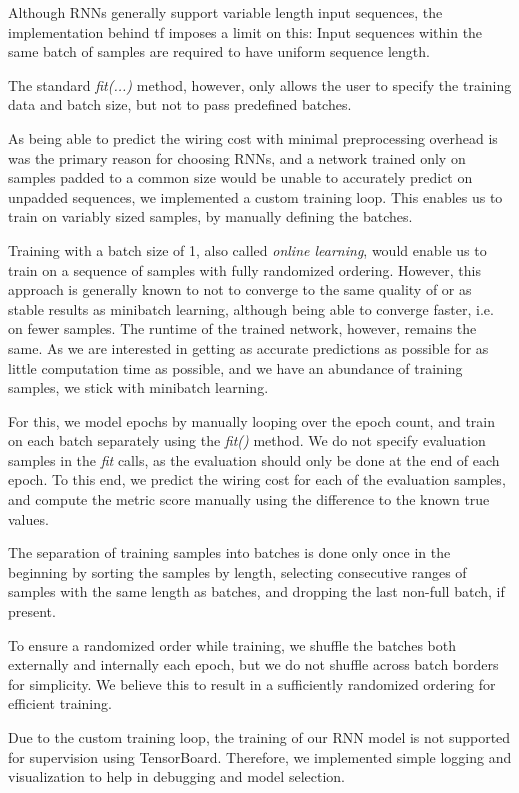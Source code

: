 Although \glspl{RNN} generally support variable length input sequences, the implementation behind \gls{tf} imposes a limit on this: Input sequences within the same batch of samples are required to have uniform sequence length.

The standard \textit{fit(...)} method, however, only allows the user to specify the training data and batch size, but not to pass predefined batches.

As being able to predict the wiring cost with minimal preprocessing overhead is was the primary reason for choosing \glspl{RNN}, and a network trained only on samples padded to a common size would be unable to accurately predict on unpadded sequences, we implemented a custom training loop. This enables us to train on variably sized samples, by manually defining the batches.

Training with a batch size of 1, also called \textit{online learning}, would enable us to train on a sequence of samples with fully randomized ordering. However, this approach is generally known to not to converge to the same quality of or as stable results as minibatch learning, although being able to converge faster, i.e. on fewer samples. The runtime of the trained network, however, remains the same. As we are interested in getting as accurate predictions as possible for as little computation time as possible, and we have an abundance of training samples, we stick with minibatch learning.

For this, we model epochs by manually looping over the epoch count, and train on each batch separately using the \textit{fit()} method. We do not specify evaluation samples in the \textit{fit} calls, as the evaluation should only be done at the end of each epoch. To this end, we predict the wiring cost for each of the evaluation samples, and compute the metric score manually using the difference to the known true values.

The separation of training samples into batches is done only once in the beginning by sorting the samples by length, selecting consecutive ranges of samples with the same length as batches, and dropping the last non-full batch, if present.

To ensure a randomized order while training, we shuffle the batches both externally and internally each epoch, but we do not shuffle across batch borders for simplicity. We believe this to result in a sufficiently randomized ordering for efficient training.

Due to the custom training loop, the training of our \gls{RNN} model is not supported for supervision using TensorBoard. Therefore, we implemented simple logging and visualization to help in debugging and model selection.

